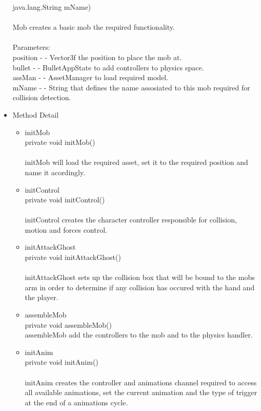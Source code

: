 \documentclass[letterpaper]{article}
\begin{document}
\begin{itemize}
  java.lang.String mName) \\ \\ 
								Mob creates a basic mob the required functionality. \\ \\
								Parameters: \\
								position - - Vector3f the position to place the mob at. \\
								bullet - - BulletAppState to add controllers to physics space. \\
								assMan - - AssetManager to load required model. \\
								mName - - String that defines the name assosiated to this mob required for collision detection.
						\item	Method Detail
								\begin{itemize}
									\item	initMob \\
											private void initMob() \\ \\
											initMob will load the required asset, set it to the required position and name it acordingly. \\ 
									\item	initControl \\
											private void initControl() \\ \\
											initControl creates the character controller responsible for collision, motion and forces control.
									\item	initAttackGhost \\
											private void initAttackGhost() \\ \\
											initAttackGhost sets up the collision box that will be bound to the mobs arm in order to determine if any collision has occured with the hand and the player.
									\item	assembleMob \\
											private void assembleMob() \\
											assembleMob add the controllers to the mob and to the physics handler. \\
									\item	initAnim \\
											private void initAnim() \\ \\
											initAnim creates the controller and animations channel required to access all available animations, set the current animation and the type of trigger at the end of a animations cycle.

\end{itemize}
\end{itemize}
\end{document}
